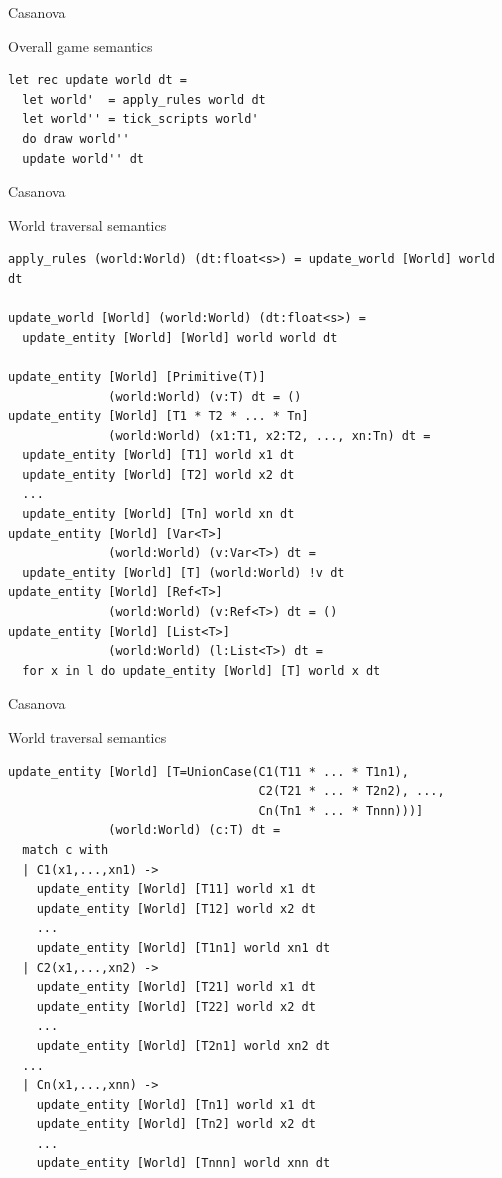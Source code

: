 \documentclass{beamer}
\begin{document}
\begin{frame}[fragile]{Casanova}
\begin{block}{Overall game semantics}
\begin{lstlisting}
let rec update world dt =
  let world'  = apply_rules world dt
  let world'' = tick_scripts world'
  do draw world''
  update world'' dt
\end{lstlisting}
\end{block}
\end{frame}
\begin{frame}[fragile]{Casanova}
\begin{block}{World traversal semantics}
\begin{lstlisting}
apply_rules (world:World) (dt:float<s>) = update_world [World] world dt

update_world [World] (world:World) (dt:float<s>) = 
  update_entity [World] [World] world world dt

update_entity [World] [Primitive(T)] 
              (world:World) (v:T) dt = ()
update_entity [World] [T1 * T2 * ... * Tn] 
              (world:World) (x1:T1, x2:T2, ..., xn:Tn) dt =
  update_entity [World] [T1] world x1 dt 
  update_entity [World] [T2] world x2 dt
  ...
  update_entity [World] [Tn] world xn dt
update_entity [World] [Var<T>] 
              (world:World) (v:Var<T>) dt = 
  update_entity [World] [T] (world:World) !v dt
update_entity [World] [Ref<T>] 
              (world:World) (v:Ref<T>) dt = ()
update_entity [World] [List<T>] 
              (world:World) (l:List<T>) dt =
  for x in l do update_entity [World] [T] world x dt
\end{lstlisting}
\end{block}
\end{frame}
\begin{frame}[fragile]{Casanova}
\begin{block}{World traversal semantics}
\begin{lstlisting}
update_entity [World] [T=UnionCase(C1(T11 * ... * T1n1), 
                                   C2(T21 * ... * T2n2), ..., 
                                   Cn(Tn1 * ... * Tnnn)))] 
              (world:World) (c:T) dt =
  match c with
  | C1(x1,...,xn1) ->
    update_entity [World] [T11] world x1 dt
    update_entity [World] [T12] world x2 dt
    ...
    update_entity [World] [T1n1] world xn1 dt
  | C2(x1,...,xn2) ->
    update_entity [World] [T21] world x1 dt
    update_entity [World] [T22] world x2 dt
    ...
    update_entity [World] [T2n1] world xn2 dt
  ...
  | Cn(x1,...,xnn) ->
    update_entity [World] [Tn1] world x1 dt
    update_entity [World] [Tn2] world x2 dt
    ...
    update_entity [World] [Tnnn] world xnn dt
\end{lstlisting}
\end{block}
\end{frame}
\end{document}
